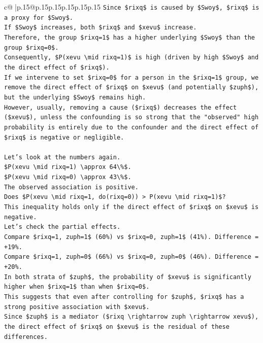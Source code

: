 \documentclass{article}
\begin{document}
{\begin{supertabular}{c@{$\;$}|p{.15\linewidth}@{}p{.15\linewidth}p{.15\linewidth}p{.15\linewidth}p{.15\linewidth}p{.15\linewidth}}
{{{\texttt{Since \$rixq\$ is caused by \$Swoy\$, \$rixq\$ is a proxy for \$Swoy\$.} \\
\texttt{If \$Swoy\$ increases, both \$rixq\$ and \$xevu\$ increase.} \\
\texttt{Therefore, the group \$rixq=1\$ has a higher underlying \$Swoy\$ than the group \$rixq=0\$.} \\
\texttt{Consequently, \$P(xevu \textbackslash{}mid rixq=1)\$ is high (driven by high \$Swoy\$ and the direct effect of \$rixq\$).} \\
\texttt{If we intervene to set \$rixq=0\$ for a person in the \$rixq=1\$ group, we remove the direct effect of \$rixq\$ on \$xevu\$ (and potentially \$zuph\$), but the underlying \$Swoy\$ remains high.} \\
\texttt{However, usually, removing a cause (\$rixq\$) decreases the effect (\$xevu\$), unless the confounding is so strong that the "observed" high probability is entirely due to the confounder and the direct effect of \$rixq\$ is negative or negligible.} \\
\\ 
\texttt{Let's look at the numbers again.} \\
\texttt{\$P(xevu \textbackslash{}mid rixq=1) \textbackslash{}approx 64\textbackslash{}\%\$.} \\
\texttt{\$P(xevu \textbackslash{}mid rixq=0) \textbackslash{}approx 43\textbackslash{}\%\$.} \\
\texttt{The observed association is positive.} \\
\texttt{Does \$P(xevu \textbackslash{}mid rixq=1, do(rixq=0)) > P(xevu \textbackslash{}mid rixq=1)\$?} \\
\texttt{This inequality holds only if the direct effect of \$rixq\$ on \$xevu\$ is negative.} \\
\texttt{Let's check the partial effects.} \\
\texttt{Compare \$rixq=1, zuph=1\$ (60\%) vs \$rixq=0, zuph=1\$ (41\%). Difference = +19\%.} \\
\texttt{Compare \$rixq=1, zuph=0\$ (66\%) vs \$rixq=0, zuph=0\$ (46\%). Difference = +20\%.} \\
\texttt{In both strata of \$zuph\$, the probability of \$xevu\$ is significantly higher when \$rixq=1\$ than when \$rixq=0\$.} \\
\texttt{This suggests that even after controlling for \$zuph\$, \$rixq\$ has a strong positive association with \$xevu\$.} \\
\texttt{Since \$zuph\$ is a mediator (\$rixq \textbackslash{}rightarrow zuph \textbackslash{}rightarrow xevu\$), the direct effect of \$rixq\$ on \$xevu\$ is the residual of these differences.} \\
}}}
\end{supertabular}}
\end{document}
